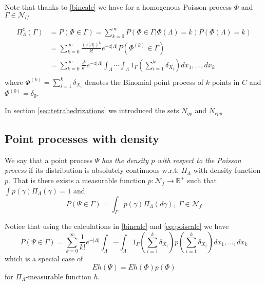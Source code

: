 Note that thanks to \ref{bincalc} we have for a homogenous Poisson process $\Phi$ and $\Gamma \in \mathcal N_{lf}$ 

\begin{align*}\label{eq:poiscalc}
	\Pi^z_\Lambda(\Gamma) &= P(\Phi \in \Gamma) = \sum^\infty_{k=0} P(\Phi \in \Gamma | \Phi(\Lambda) = k) P(\Phi(\Lambda)=k) \\
	& = \sum^\infty_{k=0} \frac{(z|\Lambda|)^k}{k!} e^{-z|\Lambda|} P(\Phi^{(k)}\in \Gamma)\\ 
	& = \sum^\infty_{k=0} \frac{z^k}{k!} e^{-z|\Lambda|} \int_\Lambda \cdots \int_\Lambda 1_{\Gamma} \left(\sum^k_{i=1} \delta_{X_i}\right) dx_1, \dots, dx_k\\
\end{align*}
where $\Phi^{(k)} = \sum^k_{i=1}\delta_{X_i}$ denotes the Binomial point process of $k$ points in $C$ and $\Phi^{(0)} = \delta_\emptyset$. 


\begin{remark}
In section \ref{sec:tetrahedrizations} we introduced the sets $N_{gp}$ and $N_{rpp}$
\end{remark}


\subsection{Point processes with density}

\begin{definition}
We say that a point process $\Psi$ \textit{has the density $p$ with respect to the Poisson process} if its distribution is absolutely continuous w.r.t. $\Pi_\Lambda$ with density function $p$. That is there exists a measurable function $p:\mathcal N_f \to \mathbb R^+$ such that $\int p(\gamma) \Pi_\Lambda (\gamma)=1$ and
$$P(\Psi \in \Gamma) = \int_\Gamma p(\gamma) \Pi_\Lambda(d\gamma), \; \Gamma \in \mathcal N_{f}$$
\end{definition}

Notice that using the calculations in \ref{bincalc} and \ref{eq:poiscalc} we have
$$P(\Psi \in \Gamma) =  \sum^\infty_{k=0} \frac{1}{k!} e^{-|\Lambda|} \int_\Lambda \cdots \int_\Lambda 1_{\Gamma} \left(\sum^k_{i=1} \delta_{X_i}\right) p\left(\sum^k_{i=1} \delta_{X_i}\right) dx_1, \dots, dx_k$$
which is a special case of 
$$Eh(\Psi)=Eh(\Phi)p(\Phi)$$
for $\Pi_\Lambda$-measurable function $h$.


